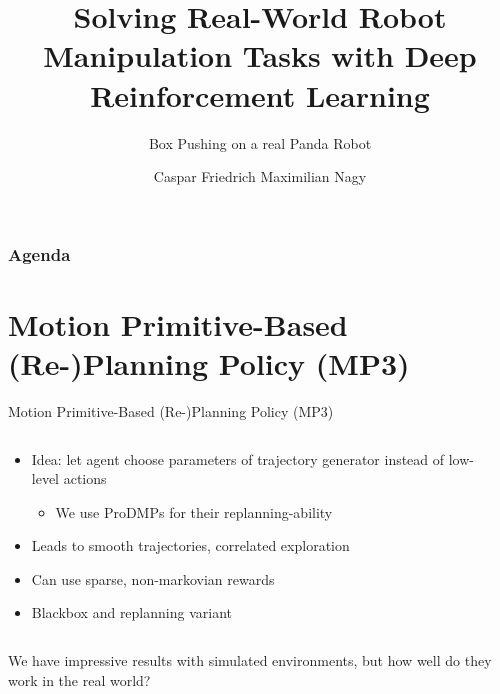 \documentclass[16:9,en,navbarinfooter]{sdqbeamer}
\author{Caspar Friedrich Maximilian Nagy}
\title{Solving Real-World Robot Manipulation Tasks with Deep Reinforcement Learning}
\subtitle{Box Pushing on a real Panda Robot}
\begin{document}
\KITtitleframe{}


\begin{frame}
\frametitle{Agenda}
\tableofcontents
\end{frame}

\section{Motion Primitive-Based (Re-)Planning Policy (MP3)}
\begin{frame}{Motion Primitive-Based (Re-)Planning Policy (MP3)}

\begin{columns}[t]
    \begin{column}{0.5\textwidth}
        \begin{itemize}
            \item Idea: let agent choose parameters of trajectory generator instead of low-level actions
                \begin{itemize}
                    \item We use ProDMPs for their replanning-ability
                \end{itemize}
            \item Leads to smooth trajectories, correlated exploration
            \item Can use sparse, non-markovian rewards
            \item Blackbox and replanning variant
        \end{itemize}
    \end{column}
    \begin{column}{0.5\textwidth}
    \end{column}
\end{columns}
\vspace{.3cm}
     We have impressive results with simulated environments, but how well do they work in the real world?
\end{frame}
\end{document}
